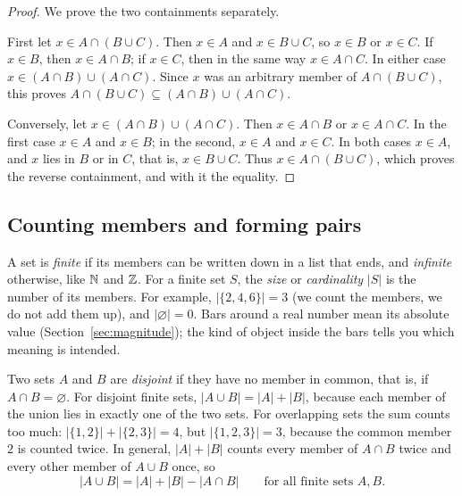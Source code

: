 \begin{proof}
We prove the two containments separately.

First let $x\in A\cap(B\cup C)$. Then $x\in A$ and $x\in B\cup C$, so $x\in B$ or $x\in C$. If $x\in B$, then $x\in A\cap B$; if $x\in C$, then in the same way $x\in A\cap C$. In either case $x\in(A\cap B)\cup(A\cap C)$. Since $x$ was an arbitrary member of $A\cap(B\cup C)$, this proves $A\cap(B\cup C)\subseteq(A\cap B)\cup(A\cap C)$.

Conversely, let $x\in(A\cap B)\cup(A\cap C)$. Then $x\in A\cap B$ or $x\in A\cap C$. In the first case $x\in A$ and $x\in B$; in the second, $x\in A$ and $x\in C$. In both cases $x\in A$, and $x$ lies in $B$ or in $C$, that is, $x\in B\cup C$. Thus $x\in A\cap(B\cup C)$, which proves the reverse containment, and with it the equality.
\end{proof}


\subsection*{Counting members and forming pairs}
A set is \emph{finite} if its members can be written down in a list that ends, and \emph{infinite} otherwise, like $\mathbb N$ and $\mathbb Z$. For a finite set $S$, the \emph{size} or \emph{cardinality} $|S|$ is the number of its members. For example, $|\{2,4,6\}|=3$ (we count the members, we do not add them up), and $|\varnothing|=0$. Bars around a real number mean its absolute value (Section~\ref{sec:magnitude}); the kind of object inside the bars tells you which meaning is intended.

Two sets $A$ and $B$ are \emph{disjoint} if they have no member in common, that is, if $A\cap B=\varnothing$. For disjoint finite sets, $|A\cup B|=|A|+|B|$, because each member of the union lies in exactly one of the two sets. For overlapping sets the sum counts too much: $|\{1,2\}|+|\{2,3\}|=4$, but $|\{1,2,3\}|=3$, because the common member $2$ is counted twice. In general, $|A|+|B|$ counts every member of $A\cap B$ twice and every other member of $A\cup B$ once, so
\[
|A\cup B|=|A|+|B|-|A\cap B|\qquad\text{for all finite sets }A,B.
\]

